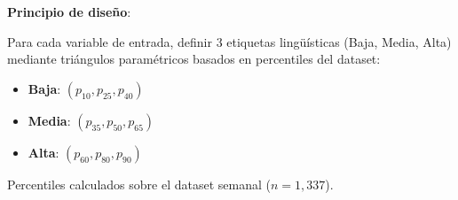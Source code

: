 \documentclass[12pt,letterpaper,twoside]{report}
\begin{document}
\begin{reglabox}
\textbf{Principio de diseño}:

Para cada variable de entrada, definir 3 etiquetas lingüísticas (Baja, Media, Alta) mediante triángulos paramétricos basados en percentiles del dataset:

\begin{itemize}[noitemsep]
    \item \textbf{Baja}: $(p_{10}, p_{25}, p_{40})$
    \item \textbf{Media}: $(p_{35}, p_{50}, p_{65})$
    \item \textbf{Alta}: $(p_{60}, p_{80}, p_{90})$
\end{itemize}

Percentiles calculados sobre el dataset semanal ($n=1,337$).
\end{reglabox}
\end{document}
